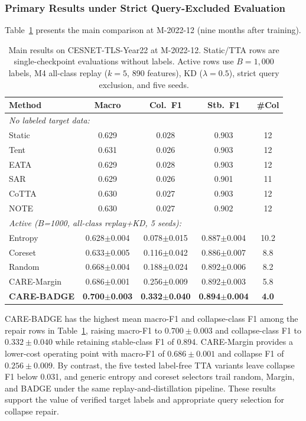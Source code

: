 \documentclass[preprint,12pt,authoryear]{elsarticle}
\newcommand{\ours}{CARE}  %
\begin{document}
\subsubsection{Primary Results under Strict Query-Excluded Evaluation}
\label{sec:primary_results}

Table~\ref{tab:main_results} presents the main comparison at M-2022-12 (nine months after training).

\begin{table}[!htbp]
\centering
\caption{Main results on CESNET-TLS-Year22 at M-2022-12. Static/TTA rows are single-checkpoint evaluations without labels. Active rows use $B{=}1{,}000$ labels, M4 all-class replay ($k{=}5$, 890 features), KD ($\lambda{=}0.5$), strict query exclusion, and five seeds.}
\label{tab:main_results}
\scriptsize
\setlength{\tabcolsep}{3pt}
\begin{tabular}{@{}l cccc@{}}
\toprule
Method & Macro & Col.\ F1 & Stb.\ F1 & \#Col \\
\midrule
\multicolumn{5}{l}{\textit{No labeled target data:}} \\
Static          & 0.629 & 0.028 & 0.903 & 12 \\
Tent            & 0.631 & 0.026 & 0.903 & 12 \\
EATA            & 0.629 & 0.028 & 0.903 & 12 \\
SAR             & 0.629 & 0.026 & 0.901 & 11 \\
CoTTA           & 0.630 & 0.027 & 0.903 & 12 \\
NOTE            & 0.630 & 0.027 & 0.902 & 12 \\
\midrule
\multicolumn{5}{l}{\textit{Active ($B$=1000, all-class replay+KD, 5 seeds):}} \\
Entropy         & 0.628$\pm$0.004 & 0.078$\pm$0.015 & 0.887$\pm$0.004 & 10.2 \\
Coreset         & 0.633$\pm$0.005 & 0.116$\pm$0.042 & 0.886$\pm$0.007 & 8.8 \\
Random          & 0.668$\pm$0.004 & 0.188$\pm$0.024 & 0.892$\pm$0.006 & 8.2 \\
\ours{}-Margin  & 0.686$\pm$0.001 & 0.256$\pm$0.009 & 0.892$\pm$0.003 & 5.8 \\
\textbf{\ours{}-BADGE} & \textbf{0.700$\pm$0.003} & \textbf{0.332$\pm$0.040} & \textbf{0.894$\pm$0.004} & \textbf{4.0} \\
\bottomrule
\end{tabular}
\end{table}

CARE-BADGE has the highest mean macro-F1 and collapse-class F1 among the repair rows in Table~\ref{tab:main_results}, raising macro-F1 to $0.700{\pm}0.003$ and collapse-class F1 to $0.332{\pm}0.040$ while retaining stable-class F1 of 0.894. CARE-Margin provides a lower-cost operating point with macro-F1 of $0.686{\pm}0.001$ and collapse F1 of $0.256{\pm}0.009$. By contrast, the five tested label-free TTA variants leave collapse F1 below 0.031, and generic entropy and coreset selectors trail random, Margin, and BADGE under the same replay-and-distillation pipeline. These results support the value of verified target labels and appropriate query selection for collapse repair.
\end{document}
